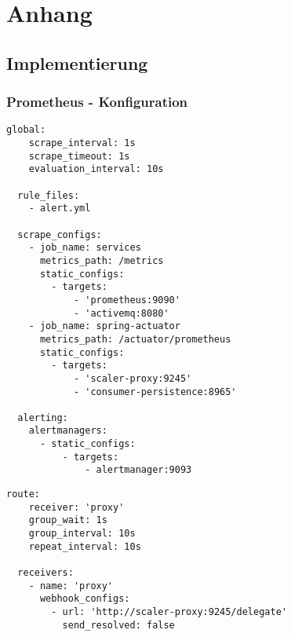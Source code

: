 \clearpage
\appendix
\clearpage
\chapter{Anhang}

\section{Implementierung}

\subsection{Prometheus - Konfiguration}


\begin{lstlisting}[style=bashStyle,caption={Prometheus Konfiguration},label=anh:prometheusYml]
  global:
	scrape_interval: 1s
	scrape_timeout: 1s
	evaluation_interval: 10s
  
  rule_files:
	- alert.yml
  
  scrape_configs:
	- job_name: services
	  metrics_path: /metrics
	  static_configs:
		- targets:
			- 'prometheus:9090'
			- 'activemq:8080'
	- job_name: spring-actuator
	  metrics_path: /actuator/prometheus
	  static_configs:
		- targets:
			- 'scaler-proxy:9245'
			- 'consumer-persistence:8965'
  
  alerting:
	alertmanagers:
	  - static_configs:
		  - targets:
			  - alertmanager:9093
\end{lstlisting}

\begin{lstlisting}[style=bashStyle,caption={Alert Manager - Konfiguration},label=lst:alertManConfig]
  route:
    receiver: 'proxy'
    group_wait: 1s
    group_interval: 10s
    repeat_interval: 10s

  receivers:
    - name: 'proxy'
      webhook_configs:
        - url: 'http://scaler-proxy:9245/delegate'
          send_resolved: false
\end{lstlisting}

